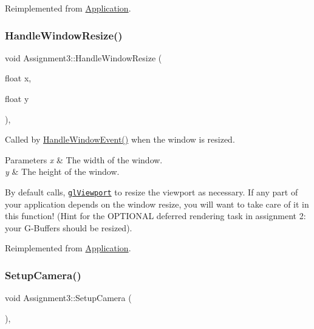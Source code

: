 Reimplemented from \hyperlink{class_application_ae6074c3f102de1cb2fe4c81b545679db}{Application}.

\hypertarget{class_assignment3_a851c637c83c8092d8adfb5c9f761daeb}{}\label{class_assignment3_a851c637c83c8092d8adfb5c9f761daeb} 
\subsubsection{\texorpdfstring{Handle\+Window\+Resize()}{HandleWindowResize()}}
{\footnotesize\ttfamily void Assignment3\+::\+Handle\+Window\+Resize (\begin{DoxyParamCaption}\item[{float}]{x,  }\item[{float}]{y }\end{DoxyParamCaption})\hspace{0.3cm}{\ttfamily [protected]}, {\ttfamily [virtual]}}



Called by \hyperlink{class_application_a74d92db64e051efa56d0357989dcb755}{Handle\+Window\+Event()} when the window is resized. 


\begin{DoxyParams}{Parameters}
{\em x} & The width of the window. \\
\hline
{\em y} & The height of the window.\\
\hline
\end{DoxyParams}
By default calls, \href{https://www.opengl.org/sdk/docs/man/html/glViewport.xhtml}{\tt gl\+Viewport} to resize the viewport as necessary. If any part of your application depends on the window resize, you will want to take care of it in this function! (Hint for the O\+P\+T\+I\+O\+N\+AL deferred rendering task in assignment 2\+: your \textquotesingle{}G-\/\+Buffers\textquotesingle{} should be resized). 

Reimplemented from \hyperlink{class_application_abdba284a0f075ee1d4a2108c3a5236a2}{Application}.

\hypertarget{class_assignment3_a1d23eb19973b78e516169f4a03954526}{}\label{class_assignment3_a1d23eb19973b78e516169f4a03954526} 
\subsubsection{\texorpdfstring{Setup\+Camera()}{SetupCamera()}}
{\footnotesize\ttfamily void Assignment3\+::\+Setup\+Camera (\begin{DoxyParamCaption}{ }\end{DoxyParamCaption})\hspace{0.3cm}{\ttfamily [private]}, {\ttfamily [virtual]}}



